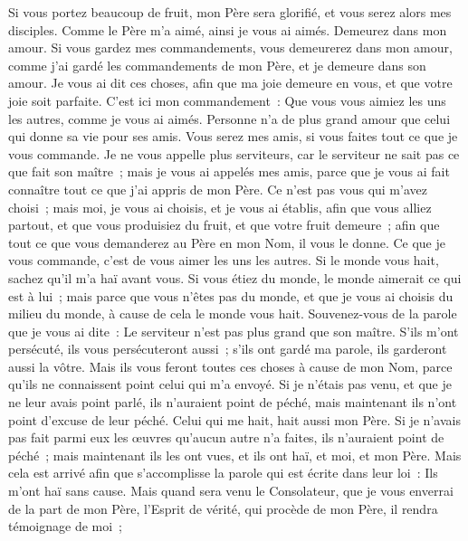 \begin{multicols}{2}
Si vous portez beaucoup de fruit, mon Père sera glorifié, et vous serez alors mes disciples.
Comme le Père m'a aimé, ainsi je vous ai aimés. Demeurez dans mon amour.
Si vous gardez mes commandements, vous demeurerez dans mon amour, comme j'ai gardé les commandements de mon Père, et je demeure dans son amour.
Je vous ai dit ces choses, afin que ma joie demeure en vous, et que votre joie soit parfaite.
C'est ici mon commandement~: Que vous vous aimiez les uns les autres, comme je vous ai aimés.
Personne n'a de plus grand amour que celui qui donne sa vie pour ses amis.
Vous serez mes amis, si vous faites tout ce que je vous commande.
Je ne vous appelle plus serviteurs, car le serviteur ne sait pas ce que fait son maître~; mais je vous ai appelés mes amis, parce que je vous ai fait connaître tout ce que j'ai appris de mon Père.
Ce n'est pas vous qui m'avez choisi~; mais moi, je vous ai choisis, et je vous ai établis, afin que vous alliez partout, et que vous produisiez du fruit, et que votre fruit demeure~; afin que tout ce que vous demanderez au Père en mon Nom, il vous le donne.
Ce que je vous commande, c'est de vous aimer les uns les autres.
Si le monde vous hait, sachez qu'il m'a haï avant vous.
Si vous étiez du monde, le monde aimerait ce qui est à lui~; mais parce que vous n'êtes pas du monde, et que je vous ai choisis du milieu du monde, à cause de cela le monde vous hait.
Souvenez-vous de la parole que je vous ai dite~: Le serviteur n'est pas plus grand que son maître. S'ils m'ont persécuté, ils vous persécuteront aussi~; s'ils ont gardé ma parole, ils garderont aussi la vôtre.
Mais ils vous feront toutes ces choses à cause de mon Nom, parce qu'ils ne connaissent point celui qui m'a envoyé.
Si je n'étais pas venu, et que je ne leur avais point parlé, ils n'auraient point de péché, mais maintenant ils n'ont point d'excuse de leur péché.
Celui qui me hait, hait aussi mon Père.
Si je n'avais pas fait parmi eux les œuvres qu'aucun autre n'a faites, ils n'auraient point de péché~; mais maintenant ils les ont vues, et ils ont haï, et moi, et mon Père.
Mais cela est arrivé afin que s'accomplisse la parole qui est écrite dans leur loi~: Ils m'ont haï sans cause.
Mais quand sera venu le Consolateur, que je vous enverrai de la part de mon Père, l'Esprit de vérité, qui procède de mon Père, il rendra témoignage de moi~;

\end{multicols}
